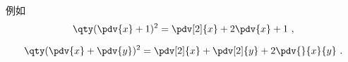 
\begin{issues}
\issueDraft
\end{issues}


例如
\begin{equation}
\qty(\pdv{x} + 1)^2 = \pdv[2]{x} + 2\pdv{x} + 1~,
\end{equation}


\begin{equation}
\qty(\pdv{x} + \pdv{y})^2 = \pdv[2]{x} + \pdv[2]{y} + 2\pdv{}{x}{y}~.
\end{equation}
